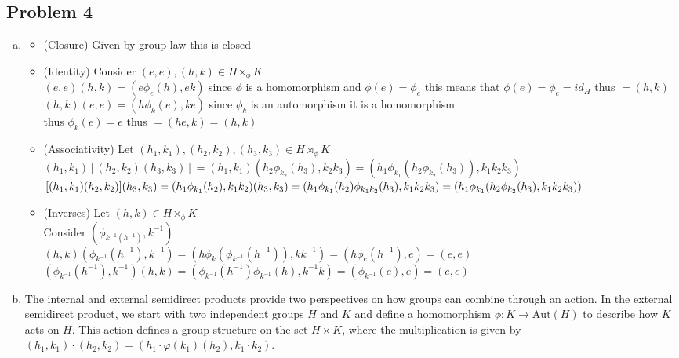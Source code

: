 \documentclass[12pt, letterpaper]{article}
\theoremstyle{definition}
\begin{document}
\newpage
\subsection*{Problem 4}
\begin{enumerate}[(a)]
    \item \begin{itemize}
        \item (Closure) Given by group law this is closed
        \item (Identity) Consider $(e,e),(h,k)\in H \rtimes_{\phi} K$\\
        $(e,e)(h,k)=(e\phi_e(h),ek)$ since $\phi$ is a homomorphism and $\phi(e)=\phi_e$ this means that $\phi(e)=\phi_e=id_H$
        thus $=(h,k)$\\
        $(h,k)(e,e)=(h\phi_k(e),ke)$ since $\phi_k$ is an automorphism it is a homomorphism\\
        thus $\phi_k(e)=e$ thus $=(he,k)=(h,k)$
        \item (Associativity) Let $(h_1,k_1),(h_2,k_2),(h_3,k_3) \in H \rtimes_\phi K$\\
        $(h_1,k_1)[(h_2,k_2)(h_3,k_3)]=(h_1,k_1)(h_2\phi_{k_2}(h_3),k_2k_3)=(h_1\phi_{k_1}(h_2\phi_{k_2}(h_3)),k_1k_2k_3)$\\
        $[(h_1,k_1)(h_2,k_2)](h_3,k_3)=(h_1\phi_{k_1}(h_2),k_1k_2)(h_3,k_3)=(h_1\phi_{k_1}(h_2)\phi_{k_1k_2}(h_3),k_1k_2k_3)\\
        =(h_1\phi_{k_1}(h_2\phi_{k_2}(h_3),k_1k_2k_3))$
        \item (Inverses) Let $(h,k) \in H \rtimes_\phi K$\\
        Consider $(\phi_{k^{-1}(h^{-1})},k^{-1})$\\
        $(h,k)(\phi_{k^{-1}}(h^{-1}),k^{-1})=(h\phi_{k}(\phi_{k^{-1}}(h^{-1})),kk^{-1})=(h\phi_{e}(h^{-1}),e)=(e,e)$\\
        $(\phi_{k^{-1}}(h^{-1}),k^{-1})(h,k)=(\phi_{k^{-1}}(h^{-1})\phi_{k^{-1}}(h),k^{-1}k)=(\phi_{k^{-1}}(e),e)=(e,e)$
    \end{itemize}
    \item The internal and external semidirect products provide two perspectives on how groups can combine through an action. 
    In the external semidirect product, we start with two independent groups \(H\) and \(K\) and define a homomorphism 
    \(\phi: K \to \text{Aut}(H)\) to describe how \(K\) acts on \(H\). 
    This action defines a group structure on the set \(H \times K\), where the multiplication is given by 
    \((h_1, k_1) \cdot (h_2, k_2) = (h_1 \cdot \varphi(k_1)(h_2), k_1 \cdot k_2)\). 

\end{enumerate}
\end{document}
